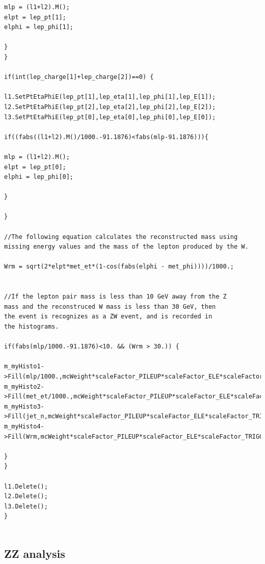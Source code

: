 \documentclass[runningheads,a4paper]{llncs}
\begin{document}
\begin{verbatim}
mlp = (l1+l2).M();
elpt = lep_pt[1];
elphi = lep_phi[1];

}
}

if(int(lep_charge[1]+lep_charge[2])==0) {
                                l1.SetPtEtaPhiE(lep_pt[1],lep_eta[1],lep_phi[1],lep_E[1]);
l2.SetPtEtaPhiE(lep_pt[2],lep_eta[2],lep_phi[2],lep_E[2]);
l3.SetPtEtaPhiE(lep_pt[0],lep_eta[0],lep_phi[0],lep_E[0]);
				
if((fabs((l1+l2).M()/1000.-91.1876)<fabs(mlp-91.1876))){
                                    
mlp = (l1+l2).M();
elpt = lep_pt[0];
elphi = lep_phi[0];

}
                        
}

//The following equation calculates the reconstructed mass using
missing energy values and the mass of the lepton produced by the W. 
                        
Wrm = sqrt(2*elpt*met_et*(1-cos(fabs(elphi - met_phi))))/1000.;


//If the lepton pair mass is less than 10 GeV away from the Z 
mass and the reconstruced W mass is less than 30 GeV, then 
the event is recognizes as a ZW event, and is recorded in 
the histograms. 
                        
if(fabs(mlp/1000.-91.1876)<10. && (Wrm > 30.)) {

m_myHisto1->Fill(mlp/1000.,mcWeight*scaleFactor_PILEUP*scaleFactor_ELE*scaleFactor_TRIGGER);	
m_myHisto2->Fill(met_et/1000.,mcWeight*scaleFactor_PILEUP*scaleFactor_ELE*scaleFactor_TRIGGER);	
m_myHisto3->Fill(jet_n,mcWeight*scaleFactor_PILEUP*scaleFactor_ELE*scaleFactor_TRIGGER);
m_myHisto4->Fill(Wrm,mcWeight*scaleFactor_PILEUP*scaleFactor_ELE*scaleFactor_TRIGGER);

}
}

l1.Delete();
l2.Delete();
l3.Delete();
}
    
\end{verbatim}
\subsection{ZZ analysis}
\end{document}
